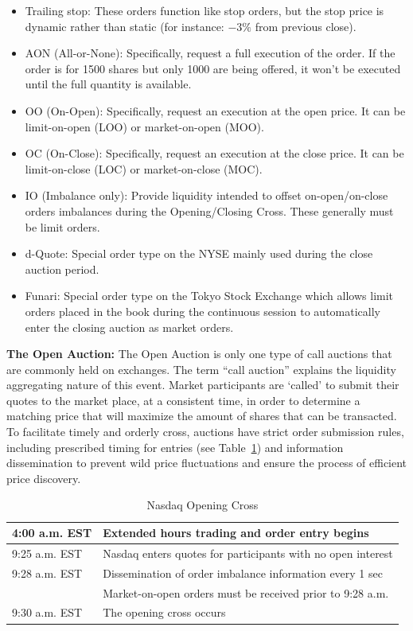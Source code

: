 \begin{itemize}
\item  Trailing stop: These orders function like stop orders, but the stop price is dynamic rather than static (for instance: $-3\%$ from previous close).

\item  AON (All-or-None): Specifically, request a full execution of the order. If the order is for 1500 shares but only 1000 are being offered, it won't be executed until the full quantity is available.

\item  OO (On-Open): Specifically, request an execution at the open price. It can be limit-on-open (LOO) or market-on-open (MOO).

\item  OC (On-Close): Specifically, request an execution at the close price. It can be limit-on-close (LOC) or market-on-close (MOC).

\item  IO (Imbalance only): Provide liquidity intended to offset on-open/on-close orders imbalances during the Opening/Closing Cross. These generally must be limit orders.

\item  d-Quote: Special order type on the NYSE mainly used during the close auction period.

\item  Funari: Special order type on the Tokyo Stock Exchange which allows limit orders placed in the book during the continuous session to automatically enter the closing auction as market orders. \\
\end{itemize} 


\noindent\textbf{The Open Auction:} The Open Auction is only one type of call auctions that are commonly held on exchanges. The term ``call auction'' explains the liquidity aggregating nature of this event. Market participants are `called' to submit their quotes to the market place, at a consistent time, in order to determine a matching price that will maximize the amount of shares that can be transacted. To facilitate timely and orderly cross, auctions have strict order submission rules, including prescribed timing for entries (see Table~\ref{tab:NASDAQopen}) and information dissemination to prevent wild price fluctuations and ensure the process of efficient price discovery.
        \begin{table}[!ht]
        \centering
        \caption{Nasdaq Opening Cross \label{tab:NASDAQopen}}
        \begin{tabular}{ll} 
        	4:00 a.m. EST & Extended hours trading and order entry begins  \\ \hline
        	9:25 a.m. EST & Nasdaq enters quotes for participants with no open interest \\ \hline
        	9:28 a.m. EST & Dissemination of order imbalance information every 1 sec  \\ 
        	 & Market-on-open orders must be received prior to 9:28 a.m.   \\ \hline	
        	9:30 a.m. EST & The opening cross occurs		
        \end{tabular}
        \end{table}	


